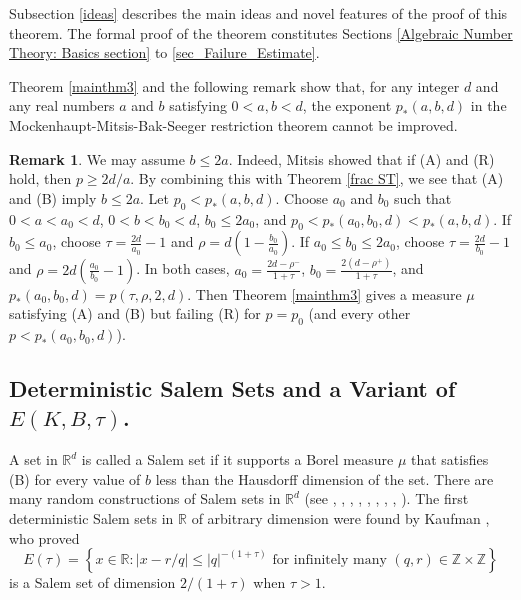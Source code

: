 \documentclass{amsart}
\numberwithin{equation}{section}
\theoremstyle{definition}
\newtheorem{remark}[theorem]{Remark}
\theoremstyle{definition}
\def\forinfmany{\text{ for infinitely many }}
\def\RR{\mathbb{R}}
\def\ZZ{\mathbb{Z}}
\newcommand{\cbr}[1]{ \left\{ {#1} \right\} }
\begin{document}
Subsection \ref{ideas} describes the main ideas and novel features of the proof of this theorem.  
The formal proof of 
the theorem 
constitutes Sections \ref{Algebraic Number Theory: Basics section} to \ref{sec_Failure_Estimate}.

Theorem \ref{mainthm3} and the following remark 
show that, for any integer $d$ and any real numbers $a$ and $b$ satisfying $0 < a, b < d$, the exponent $p_*(a,b,d)$ in  the Mockenhaupt-Mitsis-Bak-Seeger restriction theorem cannot be improved.



\begin{remark}
We may assume $b \leq 2a$. Indeed, Mitsis \cite[Proposition 3.1]{mitsis-res} 
showed that if (A) and (R) hold, then 
$p \geq 2d/a$.
By combining this with Theorem \ref{frac ST}, we see that (A) and (B) imply $b \leq 2a$. 
Let $p_0 < p_{*}(a,b,d)$. Choose $a_0$ and $b_0$ such that $0 < a < a_0 < d$, $0 < b < b_0 < d$, $b_0 \leq 2a_0$, and $p_0 < p_{*}(a_0,b_0,d) < p_{*}(a,b,d)$. 
If $b_0 \leq a_0$, choose $\tau = \frac{2d}{a_0} - 1$ and $\rho = d\left(1-\frac{b_0}{a_0}\right)$. 
If $a_0 \leq b_0 \leq 2a_0$, choose $\tau = \frac{2d}{b_0} - 1$ and $\rho = 2d\left(\frac{a_0}{b_0}-1\right)$. 
In both cases, $a_0 = \frac{2d  - \rho^-}{1 + \tau}$,  $b_0 = \frac{2(d  - \rho^+)}{1 + \tau}$, and 
$p_{*}(a_0,b_0,d) = p(\tau,\rho,2,d)$. 
Then Theorem \ref{mainthm3} gives a measure $\mu$ satisfying (A) and (B) but failing (R) for $p=p_0$ (and every other $p < p_{*}(a_0,b_0,d)$). 
\end{remark}


\subsection{Deterministic Salem Sets and a Variant of \texorpdfstring{$E(K,B,\tau)$}{E(k,B,tau}.} 

A set in $\RR^d$ is called a Salem set if it supports a Borel measure $\mu$ that satisfies (B) for every value of $b$ less than the Hausdorff dimension of the set. 
There are many random constructions of Salem sets in $\RR^d$ (see \cite{salem}, \cite{kahane-book}, \cite{kahane-1966-fourier}, \cite{kahane-1966-brownian}, \cite{bluhm-1}, \cite{chen-seeger}, \cite{ekstrom}, \cite{LP}, \cite{shmerkin-suomala}). 
The first deterministic Salem sets in $\RR$ of arbitrary dimension were found by 
Kaufman \cite{Kaufman}, who proved 
$$
E(\tau) = \cbr{x \in \RR : |x-r/q| \leq |q|^{-(1+\tau)} \forinfmany (q,r) \in \ZZ \times \ZZ }
$$
is a Salem set of dimension $2/(1+\tau)$ when $\tau > 1$. 
 
\end{document}
